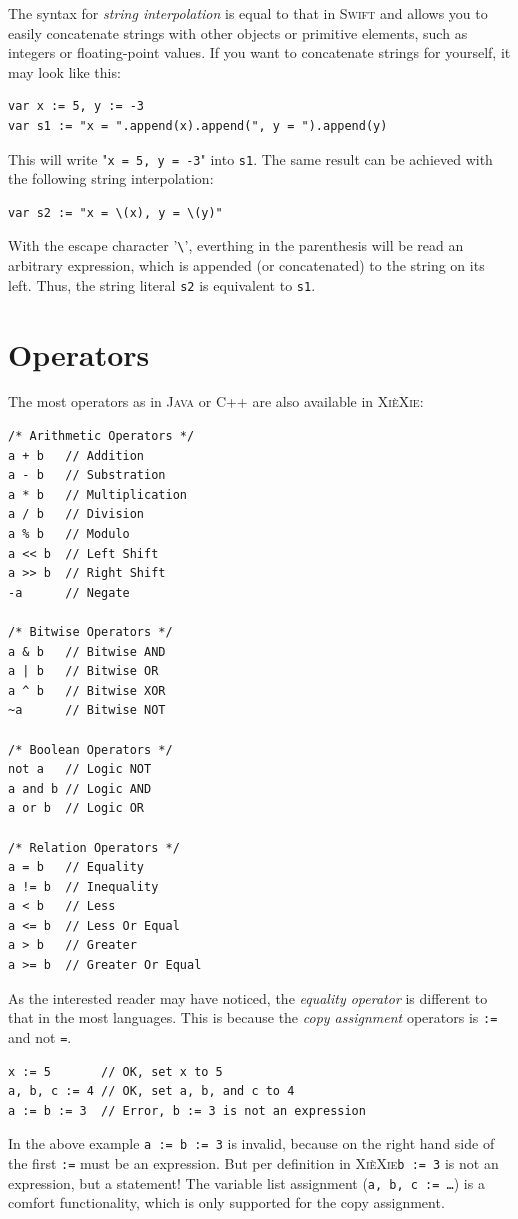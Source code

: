 \documentclass[a5paper]{report}
\def\xiexie{\textsc{Xi\`eXie}\xspace}
\def\cpp{\textsc{C++}\xspace}
\def\java{\textsc{Java}\xspace}
\def\swift{\textsc{Swift}\xspace}
\begin{document}
The syntax for \textit{string interpolation} is equal to that in \swift and allows you to easily concatenate
strings with other objects or primitive elements, such as integers or floating-point values. If you want to concatenate
strings for yourself, it may look like this:
\begin{lstlisting}
var x := 5, y := -3
var s1 := "x = ".append(x).append(", y = ").append(y)
\end{lstlisting}
This will write "\texttt{x = 5, y = -3}" into \texttt{s1}. The same result can be achieved with the following
string interpolation:
\begin{lstlisting}
var s2 := "x = \(x), y = \(y)"
\end{lstlisting}
With the escape character '\texttt{\textbackslash}', everthing in the parenthesis will be read an arbitrary expression,
which is appended (or concatenated) to the string on its left.
Thus, the string literal \texttt{s2} is equivalent to \texttt{s1}.



\section{Operators}

The most operators as in \java or \cpp are also available in \xiexie:
\begin{lstlisting}
/* Arithmetic Operators */
a + b   // Addition
a - b   // Substration
a * b   // Multiplication
a / b   // Division
a % b   // Modulo
a << b  // Left Shift
a >> b  // Right Shift
-a      // Negate

/* Bitwise Operators */
a & b   // Bitwise AND
a | b   // Bitwise OR
a ^ b   // Bitwise XOR
~a      // Bitwise NOT

/* Boolean Operators */
not a   // Logic NOT
a and b // Logic AND
a or b  // Logic OR

/* Relation Operators */
a = b   // Equality
a != b  // Inequality
a < b   // Less
a <= b  // Less Or Equal
a > b   // Greater
a >= b  // Greater Or Equal
\end{lstlisting}
As the interested reader may have noticed, the \textit{equality operator} is different to that in the most languages.
This is because the \textit{copy assignment} operators is \texttt{:=} and not \texttt{=}.
\begin{lstlisting}
x := 5       // OK, set x to 5
a, b, c := 4 // OK, set a, b, and c to 4
a := b := 3  // Error, b := 3 is not an expression
\end{lstlisting}
In the above example \texttt{a := b := 3} is invalid, because on the right hand side of the first \texttt{:=} must be
an expression. But per definition in \xiexie \texttt{b := 3} is not an expression, but a statement!
The variable list assignment (\texttt{a, b, c := \dots}) is a comfort functionality, which is only supported for the
copy assignment.
\end{document}
